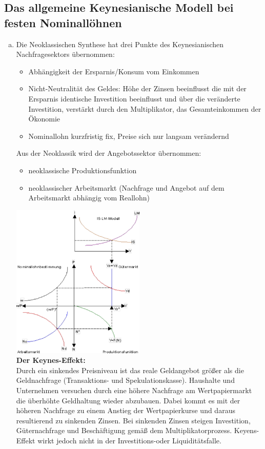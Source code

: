 \documentclass{scrartcl}
\begin{document}
\subsection{Das allgemeine Keynesianische Modell bei festen Nominall\"{o}hnen}
\begin{enumerate}[(a)]
  \item Die Neoklassischen Synthese hat drei Punkte des Keynesianischen Nachfragesektors \"{u}bernommen:
  \begin{itemize}
    \item Abh\"{a}ngigkeit der Ersparnis/Konsum vom Einkommen
    \item Nicht-Neutralit\"{a}t des Geldes: H\"{o}he der Zinsen beeinflusst die mit der Ersparnis identische Investition beeinflusst und \"{u}ber die ver\"{a}nderte Investition, verst\"{a}rkt durch den Multiplikator, das Gesamteinkommen der \"{O}konomie
    \item Nominallohn kurzfristig fix, Preise sich nur langsam ver\"{a}ndernd
  \end{itemize}
  Aus der Neoklassik wird der Angebotssektor \"{u}bernommen:
  \begin{itemize}
    \item neoklassische Produktionsfunktion
    \item neoklassischer Arbeitsmarkt (Nachfrage und Angebot auf dem Arbeitsmarkt abh\"{a}ngig vom Reallohn)
  \end{itemize}
    \includegraphics[width=0.5\textwidth]{Bilder/Neoklassische_Synthese_Normal.pdf}\\
\textbf{Der Keynes-Effekt:}\\
    Durch ein sinkendes Preisniveau ist das reale Geldangebot gr\"{o}{\ss}er als die Geldnachfrage (Transaktions- und Spekulationskasse). Haushalte und Unternehmen versuchen durch eine h\"{o}here Nachfrage am Wertpapiermarkt die \"{u}berh\"{o}hte Geldhaltung wieder abzubauen. Dabei kommt es mit der h\"{o}heren Nachfrage zu einem Anstieg der Wertpapierkurse und daraus resultierend zu sinkenden Zinsen. Bei sinkenden Zinsen steigen Investition, G\"{u}ternachfrage und Besch\"{a}ftigung gem\"{a}{\ss} dem Multiplikatorprozess. Keyens-Effekt wirkt jedoch nicht in der Investitions-oder Liquidit\"{a}tsfalle.


\end{enumerate}
\end{document}
